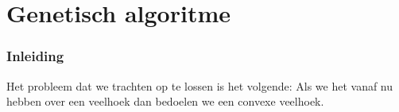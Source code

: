 


\part{Genetisch algoritme}
\section{Inleiding}
\label{sec:inleiding}
Het probleem dat we trachten op te lossen is het volgende: %
Als we het vanaf nu hebben over een veelhoek dan bedoelen we een convexe veelhoek.

